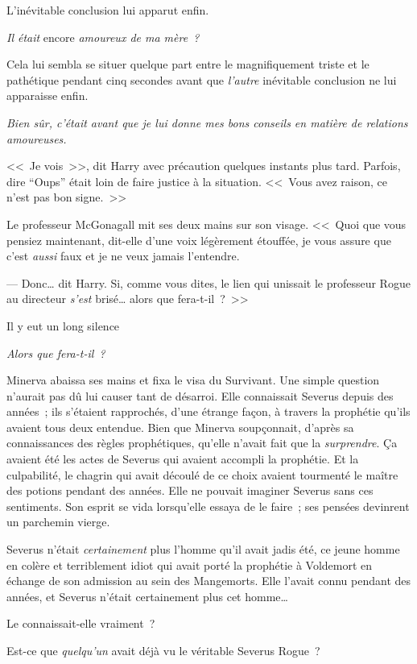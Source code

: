 L'inévitable conclusion lui apparut enfin.

\emph{Il était} encore \emph{amoureux de ma mère~?}

Cela lui sembla se situer quelque part entre le magnifiquement triste et le pathétique pendant cinq secondes avant que \emph{l'autre} inévitable conclusion ne lui apparaisse enfin.

\emph{Bien sûr, c'était avant que je lui donne mes bons conseils en matière de relations amoureuses.}

<<~Je vois~>>, dit Harry avec précaution quelques instants plus tard. Parfois, dire “Oups” était loin de faire justice à la situation. <<~Vous avez raison, ce n'est pas bon signe.~>>

Le professeur McGonagall mit ses deux mains sur son visage. <<~Quoi que vous pensiez maintenant, dit-elle d'une voix légèrement étouffée, je vous assure que c'est \emph{aussi} faux et je ne veux jamais l'entendre.

--- Donc… dit Harry. Si, comme vous dites, le lien qui unissait le professeur Rogue au directeur \emph{s'est} brisé… alors que fera-t-il~?~>>

Il y eut un long silence

\later

\emph{Alors que fera-t-il~?}

Minerva abaissa ses mains et fixa le visa du Survivant. Une simple question n'aurait pas dû lui causer tant de désarroi. Elle connaissait Severus depuis des années~; ils s'étaient rapprochés, d'une étrange façon, à travers la prophétie qu'ils avaient tous deux entendue. Bien que Minerva soupçonnait, d'après sa connaissances des règles prophétiques, qu'elle n'avait fait que la \emph{surprendre}. Ça avaient été les actes de Severus qui avaient accompli la prophétie. Et la culpabilité, le chagrin qui avait découlé de ce choix avaient tourmenté le maître des potions pendant des années. Elle ne pouvait imaginer Severus sans ces sentiments. Son esprit se vida lorsqu'elle essaya de le faire~; ses pensées devinrent un parchemin vierge.

Severus n'était \emph{certainement} plus l'homme qu'il avait jadis été, ce jeune homme en colère et terriblement idiot qui avait porté la prophétie à Voldemort en échange de son admission au sein des Mangemorts. Elle l'avait connu pendant des années, et Severus n'était certainement plus cet homme…

Le connaissait-elle vraiment~?

Est-ce que \emph{quelqu'un} avait déjà vu le véritable Severus Rogue~?

